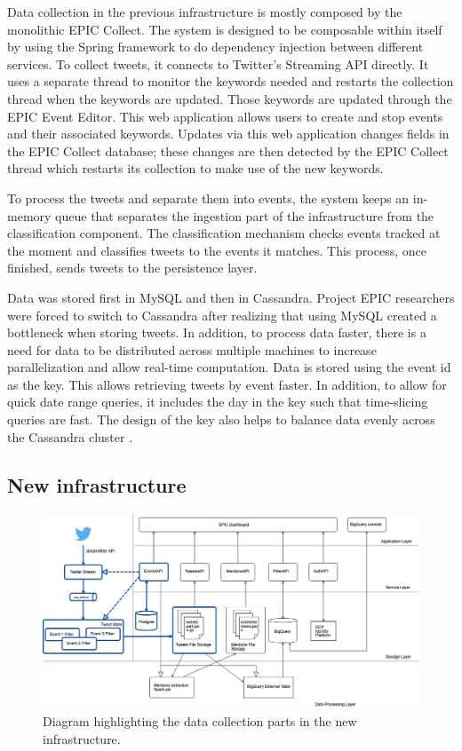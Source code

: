 Data collection in the previous infrastructure is mostly composed by the monolithic EPIC Collect. The system is designed to be composable within itself by using the Spring framework to do dependency injection between different services. To collect tweets, it connects to Twitter’s Streaming API directly. It uses a separate thread to monitor the keywords needed and restarts the collection thread when the keywords are updated. Those keywords are updated through the EPIC Event Editor. This web application allows users to create and stop events and their associated keywords. Updates via this web application changes fields in the EPIC Collect database; these changes are then detected by the EPIC Collect thread which restarts its collection to make use of the new keywords. 

To process the tweets and separate them into events, the system keeps an in-memory queue that separates the ingestion part of the infrastructure from the classification component. The classification mechanism checks events tracked at the moment and classifies tweets to the events it matches. This process, once finished, sends tweets to the persistence layer. 

Data was stored first in MySQL and then in Cassandra. Project EPIC researchers were forced to switch to Cassandra after realizing that using MySQL created a bottleneck when storing tweets. In addition, to process data faster, there is a need for data to be distributed across multiple machines to increase parallelization and allow real-time computation. Data is stored using the event id as the key. This allows retrieving tweets by event faster. In addition, to allow for quick date range queries, it includes the day in the key such that time-slicing queries are fast. The design of the key also helps to balance data evenly across the Cassandra cluster \cite{anderson2015design}. 

\subsection{New infrastructure}

\begin{figure}[htbp]
	\caption{\label{fig:newinfracollection}
	Diagram highlighting the data collection parts in the new infrastructure.
	}
    \begin{center}
	\includegraphics[width=150mm]{figs/infrav1_collection.png}
    \end{center}
\label{xfigDiagram}
\end{figure}

